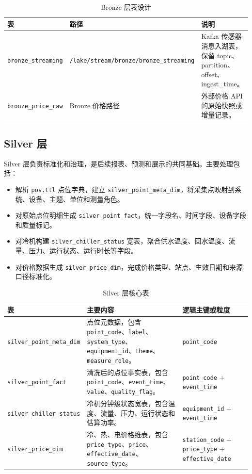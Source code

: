 \documentclass[UTF8,11pt,a4paper]{ctexart}
\newcommand{\code}[1]{\texttt{#1}}
\begin{document}
\begin{table}[H]
\centering
\small
\begin{tabularx}{\textwidth}{p{3.5cm}p{5.2cm}Y}
\toprule
表 & 路径 & 说明 \\
\midrule
\code{bronze\_streaming} & \code{/lake/stream/bronze/bronze\_streaming} & Kafka 传感器消息入湖表，保留 topic、partition、offset、ingest\_time。 \\
\code{bronze\_price\_raw} & Bronze 价格路径 & 外部价格 API 的原始快照或增量记录。 \\
\bottomrule
\end{tabularx}
\caption{Bronze 层表设计}
\end{table}

\subsection{Silver 层}

Silver 层负责标准化和治理，是后续报表、预测和展示的共同基础。主要处理包括：

\begin{itemize}
  \item 解析 \code{pos.ttl} 点位字典，建立 \code{silver\_point\_meta\_dim}，将采集点映射到系统、设备、主题、单位和测量角色。
  \item 对原始点位明细生成 \code{silver\_point\_fact}，统一字段名、时间字段、设备字段和质量标记。
  \item 对冷机构建 \code{silver\_chiller\_status} 宽表，聚合供水温度、回水温度、流量、压力、运行状态、运行时长等字段。
  \item 对价格数据生成 \code{silver\_price\_dim}，完成价格类型、站点、生效日期和来源口径标准化。
\end{itemize}

\begin{table}[H]
\centering
\small
\begin{tabularx}{\textwidth}{p{3.2cm}Yp{4.1cm}}
\toprule
表 & 主要内容 & 逻辑主键或粒度 \\
\midrule
\code{silver\_point\_meta\_dim} & 点位元数据，包含 \code{point\_code}、\code{label}、\code{system\_type}、\code{equipment\_id}、\code{theme}、\code{measure\_role}。 & \code{point\_code} \\
\code{silver\_point\_fact} & 清洗后的点位事实表，包含 \code{point\_code}、\code{event\_time}、\code{value}、\code{quality\_flag}。 & \code{point\_code} + \code{event\_time} \\
\code{silver\_chiller\_status} & 冷机分钟级状态宽表，包含温度、流量、压力、运行状态和估算功率。 & \code{equipment\_id} + \code{event\_time} \\
\code{silver\_price\_dim} & 冷、热、电价格维表，包含 \code{price\_type}、\code{price}、\code{effective\_date}、\code{source\_type}。 & \code{station\_code} + \code{price\_type} + \code{effective\_date} \\
\bottomrule
\end{tabularx}
\caption{Silver 层核心表}
\end{table}
\end{document}
